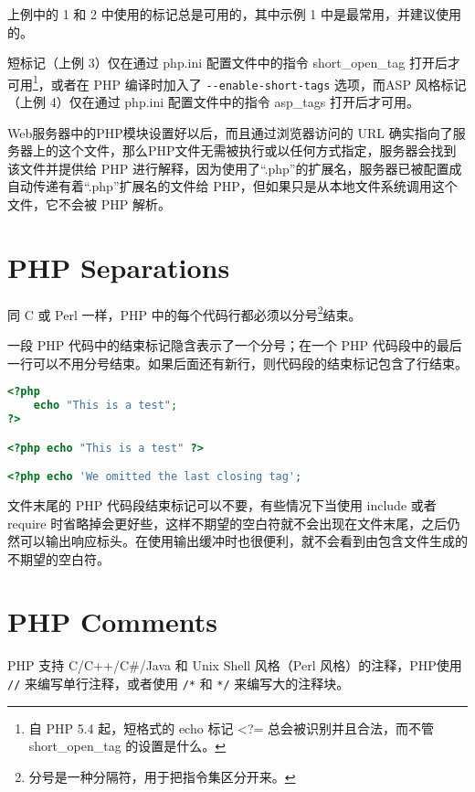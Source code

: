 上例中的 1 和 2 中使用的标记总是可用的，其中示例 1 中是最常用，并建议使用的。

短标记（上例 3）仅在通过 php.ini 配置文件中的指令 short\_open\_tag 打开后才可用\footnote{自 PHP 5.4 起，短格式的 echo 标记 <?= 总会被识别并且合法，而不管 short\_open\_tag 的设置是什么。}，或者在 PHP 编译时加入了 \texttt{-\/-enable-short-tags} 选项，而ASP 风格标记（上例 4）仅在通过 php.ini 配置文件中的指令 asp\_tags 打开后才可用。

Web服务器中的PHP模块设置好以后，而且通过浏览器访问的 URL 确实指向了服务器上的这个文件，那么PHP文件无需被执行或以任何方式指定，服务器会找到该文件并提供给 PHP 进行解释，因为使用了“.php”的扩展名，服务器已被配置成自动传递有着“.php”扩展名的文件给 PHP，但如果只是从本地文件系统调用这个文件，它不会被 PHP 解析。



\section{PHP Separations}

同 C 或 Perl 一样，PHP 中的每个代码行都必须以分号\footnote{分号是一种分隔符，用于把指令集区分开来。}结束。

一段 PHP 代码中的结束标记隐含表示了一个分号；在一个 PHP 代码段中的最后一行可以不用分号结束。如果后面还有新行，则代码段的结束标记包含了行结束。

\begin{lstlisting}[language=PHP]
<?php
    echo "This is a test";
?>

<?php echo "This is a test" ?>

<?php echo 'We omitted the last closing tag';
\end{lstlisting}

文件末尾的 PHP 代码段结束标记可以不要，有些情况下当使用 include 或者 require 时省略掉会更好些，这样不期望的空白符就不会出现在文件末尾，之后仍然可以输出响应标头。在使用输出缓冲时也很便利，就不会看到由包含文件生成的不期望的空白符。









\section{PHP Comments}

PHP 支持 C/C++/C\#/Java 和 Unix Shell 风格（Perl 风格）的注释，PHP使用 \texttt{//} 来编写单行注释，或者使用 \texttt{/*} 和 \texttt{*/} 来编写大的注释块。


